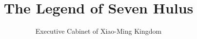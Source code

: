 \documentclass[12pt, a4paper]{book}
\title{\textbf{The Legend of Seven Hulus}}
\author{Executive Cabinet of Xiao-Ming Kingdom}
\date{}
\begin{document}
\begin{CJK}{UTF8}{gbsn}

    \maketitle
    \clearpage
    \thispagestyle{empty}

    \frontmatter

    
    

    \tableofcontents

    \mainmatter

    
    

    \appendix

    

\end{CJK}
\end{document}
